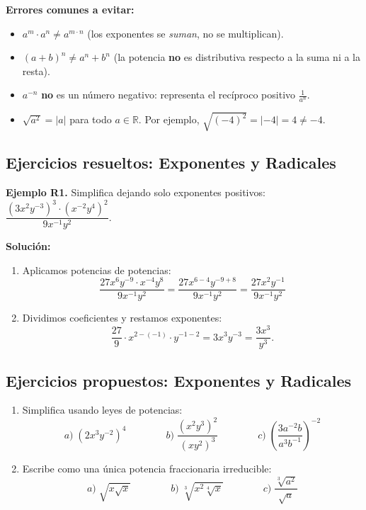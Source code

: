 \documentclass[12pt, letterpaper]{article}
\begin{document}
\begin{cuadroadvertencia}
      \textbf{Errores comunes a evitar:}
      \begin{itemize}[leftmargin=*]
            \item $a^m \cdot a^n \neq a^{m \cdot n}$ \quad (los exponentes se \emph{suman}, no se multiplican).
            \item $(a + b)^n \neq a^n + b^n$ \quad (la potencia \textbf{no} es distributiva respecto a la suma ni a la resta).
            \item $a^{-n}$ \textbf{no} es un número negativo: representa el recíproco positivo $\frac{1}{a^n}$.
            \item $\sqrt{a^2} = |a|$ para todo $a \in \mathbb{R}$. Por ejemplo, $\sqrt{(-4)^2} = |-4| = 4 \neq -4$.
      \end{itemize}
\end{cuadroadvertencia}

\subsection{Ejercicios resueltos: Exponentes y Radicales}

\textbf{Ejemplo R1.} Simplifica dejando solo exponentes positivos: $\dfrac{(3x^2 y^{-3})^3 \cdot (x^{-2} y^4)^2}{9x^{-1} y^2}$.

\begin{cuadrosolucion}
      \textbf{Solución:}
      \begin{enumerate}
            \item Aplicamos potencias de potencias:
                  $$\frac{27 x^6 y^{-9} \cdot x^{-4} y^8}{9 x^{-1} y^2} = \frac{27 x^{6 - 4} y^{-9 + 8}}{9 x^{-1} y^2} = \frac{27 x^2 y^{-1}}{9 x^{-1} y^2}$$
            \item Dividimos coeficientes y restamos exponentes:
                  $$\frac{27}{9} \cdot x^{2 - (-1)} \cdot y^{-1 - 2} = 3 x^3 y^{-3} = \frac{3x^3}{y^3}.$$
      \end{enumerate}
\end{cuadrosolucion}

\subsection{Ejercicios propuestos: Exponentes y Radicales}

\begin{enumerate}[series=ejercicios, leftmargin=*]
      \item \facil{} Simplifica usando leyes de potencias:
            $$a)\; (2x^3 y^{-2})^4 \qquad\qquad b)\; \frac{(x^2 y^3)^2}{(x y^2)^3} \qquad\qquad c)\; \left(\frac{3a^{-2} b}{a^3 b^{-1}}\right)^{-2}$$

      \item \facil{} Escribe como una única potencia fraccionaria irreducible:
            $$a)\; \sqrt{x\sqrt{x}} \qquad\qquad b)\; \sqrt[3]{x^2 \sqrt[4]{x}} \qquad\qquad c)\; \frac{\sqrt[3]{a^2}}{\sqrt{a}}$$
\end{enumerate}
\end{document}
